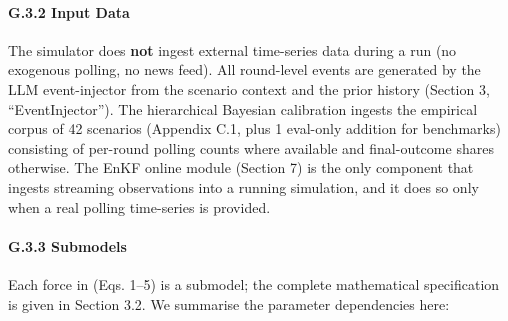 \documentclass[
]{article}
\begin{document}
\paragraph{G.3.2 Input Data}\label{g.3.2-input-data}

The simulator does \textbf{not} ingest external time-series data during
a run (no exogenous polling, no news feed). All round-level events are
generated by the LLM event-injector from the scenario context and the
prior history (Section 3, ``EventInjector''). The hierarchical Bayesian
calibration ingests the empirical corpus of 42 scenarios (Appendix C.1,
plus 1 eval-only addition for benchmarks) consisting of per-round
polling counts where available and final-outcome shares otherwise. The
EnKF online module (Section 7) is the only component that ingests
streaming observations into a running simulation, and it does so only
when a real polling time-series is provided.

\paragraph{G.3.3 Submodels}\label{g.3.3-submodels}

Each force in (Eqs. 1--5) is a submodel; the complete mathematical
specification is given in Section 3.2. We summarise the parameter
dependencies here:
\end{document}
